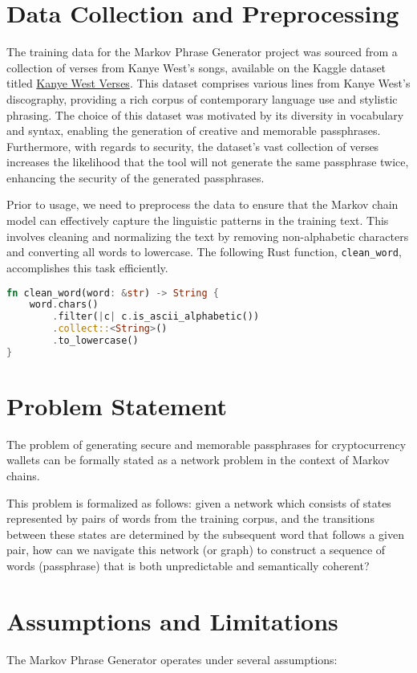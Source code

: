 \documentclass[a4paper,12pt]{article}
\begin{document}
\section{Data Collection and Preprocessing}
The training data for the Markov Phrase Generator project was sourced from a collection of verses from Kanye West's songs, available on the Kaggle dataset titled \href{https://www.kaggle.com/viccalexander/kanyewestverses}{Kanye West Verses}.
This dataset comprises various lines from Kanye West's discography, providing a rich corpus of contemporary language use and stylistic phrasing. The choice of this dataset was motivated by its diversity in vocabulary and syntax, enabling the generation of creative and memorable passphrases.
Furthermore, with regards to security, the dataset's vast collection of verses increases the likelihood that the tool will not generate the same passphrase twice, enhancing the security of the generated passphrases.

Prior to usage, we need to preprocess the data to ensure that the Markov chain model can effectively capture the linguistic patterns in the training text. This involves cleaning and normalizing the text by removing non-alphabetic characters and converting all words to lowercase. The following Rust function, \texttt{clean\_word}, accomplishes this task efficiently.

\begin{lstlisting}[language=Rust, caption={Preprocessing Function}]
  fn clean_word(word: &str) -> String {
    word.chars()
        .filter(|c| c.is_ascii_alphabetic())
        .collect::<String>()
        .to_lowercase()
}
\end{lstlisting}

\section{Problem Statement}
The problem of generating secure and memorable passphrases for cryptocurrency wallets can be formally stated as a network problem in the context of Markov chains.

This problem is formalized as follows: given a network which consists of states represented by pairs of words from the training corpus, and the transitions between these states are determined by the subsequent word that follows a given pair,
how can we navigate this network (or graph) to construct a sequence of words (passphrase) that is both unpredictable and semantically coherent?

\section{Assumptions and Limitations}
The Markov Phrase Generator operates under several assumptions:
\end{document}
